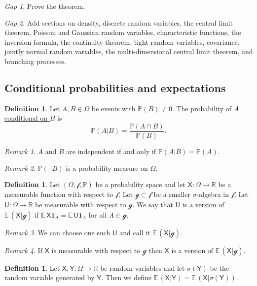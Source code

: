 \documentclass[11pt]{article}
\newcommand{\col}[1]{\mathscr{#1}}
\newcommand{\rv}[1]{\mathsf{#1}}
\newcommand{\p}{\mathbb{P}}
\newcommand{\ex}{\mathbb{E}\,}
\newcommand{\ind}[1]{\mathbf{1}_{#1}}
\newcommand{\defname}[1]{\underline{#1}}
\newcommand{\RR}{\mathbb{R}}
\theoremstyle{theorem}
\theoremstyle{definition}
\newtheorem{definition}[theorem]{Definition}
\theoremstyle{remark}
\newtheorem*{remark}{Remark}
\theoremstyle{step}
\theoremstyle{gap}
\newtheorem*{gap}{Gap}
\begin{document}
\begin{gap}
Prove the theorem.
\end{gap}

\begin{gap}
Add sections on density, discrete random variables, the central limit theorem, Poisson and Gaussian random variables, characteristic functions, the inversion formula, the continuity theorem, tight random variables, covariance, jointly normal random variables, the multi-dimensional central limit theorem, and branching processes.
\end{gap}

\subsection{Conditional probabilities and expectations}

\begin{definition}
Let \(A,B\in\Omega\) be events with \(\p(B)\neq 0\). The \defname{probability of \(A\) conditional on \(B\)} is
\[\p(A|B) = \frac{\p(A \cap B)}{\p(B)}.\]
\end{definition}

\begin{remark}
\(A\) and \(B\) are independent if and only if \(\p(A|B) = \p(A)\).
\end{remark}

\begin{remark}
\(\p(\cdot|B)\) is a probability measure on \(\Omega\).
\end{remark}

\begin{definition}
Let \((\Omega, \col{f}, \p)\) be a probability space and let \(\rv{X}:\Omega \to \RR\) be a measurable function with respect to \(\col{f}\). Let \(\col{g} \subset \col{f}\) be a smaller \(\sigma\)-algebra in \(\col{f}\). Let \(\rv{U}:\Omega\to\RR\) be measurable with respect to \(\col{g}\). We say that \(\rv{U}\) is a \defname{version of \(\ex(\rv{X}|\col{g})\)} if \(\ex \rv{X} \ind{A} = \ex \rv{U} \ind{A}\) for all \(A \in \col{g}\).
\end{definition}

\begin{remark}
We can choose one such \(\rv{U}\) and call it \(\ex(\rv{X}|\col{g})\).
\end{remark}

\begin{remark}
If \(\rv{X}\) is measurable with respect to \(\col{g}\) then \(\rv{X}\) is a version of \(\ex(\rv{X}|\col{g})\).
\end{remark}

\begin{definition}
Let \(\rv{X}, \rv{Y} : \Omega \to \RR\) be random variables and let \(\sigma(\rv{Y})\) be the random variable generated by \(\rv{Y}\). Then we define \(\ex(\rv{X}|\rv{Y}) = \ex(\rv{X}|\sigma(\rv{Y}))\).
\end{definition}
\end{document}
